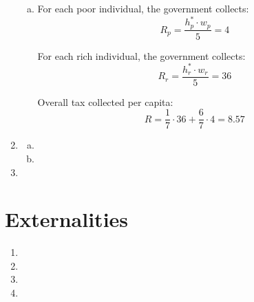\documentclass{article}
\begin{document}
\begin{enumerate}[1.]
\begin{enumerate}[a.]
            \item For each poor individual, the government collects:
                $$ R_{p} = \frac{ h_{p}^{*} \cdot w_{p} }{ 5 } = 4 $$

                For each rich individual, the government collects:
                $$ R_{r} = \frac{ h_{r}^{*} \cdot w_{r} }{ 5 } = 36 $$

                Overall tax collected per capita:
                $$ R =  \frac{ 1 }{ 7 } \cdot 36 + \frac{ 6 }{ 7 } \cdot 4 =
                8.57$$

        \end{enumerate}
        
    \item 
        \begin{enumerate}[a.]
            \item 
            \item 
        \end{enumerate}

    \item 
\end{enumerate}

\section{ Externalities }

\begin{enumerate}[1.]
    \item 
    \item 
    \item 
    \item 
\end{enumerate}
\end{document}
